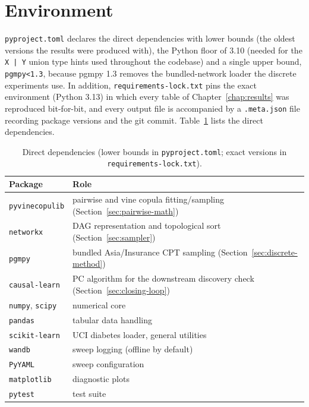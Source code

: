\documentclass[
  english,
  class=report,
  accentcolor=2c,
  marginpar=false,
  parskip=half-,
  fontsize=11pt,
  ruledheaders=false,
  pdfa=false,
  IMRAD=false,
  thesis={type=master}
]{tudapub}
\begin{document}
\section{Environment}
\label{sec:environment}
\texttt{pyproject.toml} declares the direct dependencies with lower bounds
(the oldest versions the results were produced with), the Python floor of
3.10 (needed for the \texttt{X | Y} union type hints used throughout the
codebase) and a single upper bound, \texttt{pgmpy<1.3}, because pgmpy 1.3
removes the bundled-network loader the discrete experiments use. In
addition, \texttt{requirements-lock.txt} pins the exact environment
(Python 3.13) in which every table of Chapter~\ref{chap:results} was
reproduced bit-for-bit, and every output file is accompanied by a
\texttt{.meta.json} file recording package versions and the git commit.
Table~\ref{tab:deps} lists the direct dependencies.

\begin{table}[ht]
\caption{Direct dependencies (lower bounds in \texttt{pyproject.toml}; exact versions in \texttt{requirements-lock.txt}).}
\label{tab:deps}
\centering
\begin{tabular}{ll}
\toprule
\textbf{Package} & \textbf{Role} \\
\midrule
\texttt{pyvinecopulib} & pairwise and vine copula fitting/sampling (Section~\ref{sec:pairwise-math}) \\
\texttt{networkx} & DAG representation and topological sort (Section~\ref{sec:sampler}) \\
\texttt{pgmpy} & bundled Asia/Insurance CPT sampling (Section~\ref{sec:discrete-method}) \\
\texttt{causal-learn} & PC algorithm for the downstream discovery check (Section~\ref{sec:closing-loop}) \\
\texttt{numpy}, \texttt{scipy} & numerical core \\
\texttt{pandas} & tabular data handling \\
\texttt{scikit-learn} & UCI diabetes loader, general utilities \\
\texttt{wandb} & sweep logging (offline by default) \\
\texttt{PyYAML} & sweep configuration \\
\texttt{matplotlib} & diagnostic plots \\
\texttt{pytest} & test suite \\
\bottomrule
\end{tabular}
\end{table}
\end{document}

